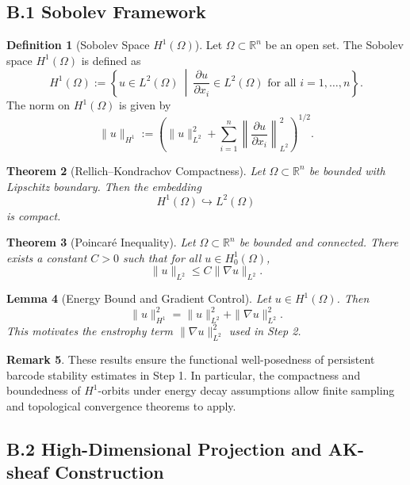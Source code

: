 \documentclass[11pt]{article}
\newtheorem{theorem}{Theorem}[section]
\newtheorem{lemma}[theorem]{Lemma}
\theoremstyle{definition}
\newtheorem{definition}[theorem]{Definition}
\newtheorem{remark}[theorem]{Remark}
\begin{document}
\subsection*{B.1 Sobolev Framework}

\begin{definition}[Sobolev Space \( H^1(\Omega) \)]
Let \( \Omega \subset \mathbb{R}^n \) be an open set. The Sobolev space \( H^1(\Omega) \) is defined as
\[
H^1(\Omega) := \left\{ u \in L^2(\Omega) \ \middle| \ \frac{\partial u}{\partial x_i} \in L^2(\Omega) \text{ for all } i = 1,\dots,n \right\}.
\]
The norm on \( H^1(\Omega) \) is given by
\[
\|u\|_{H^1} := \left( \|u\|_{L^2}^2 + \sum_{i=1}^n \left\| \frac{\partial u}{\partial x_i} \right\|_{L^2}^2 \right)^{1/2}.
\]
\end{definition}

\begin{theorem}[Rellich--Kondrachov Compactness]
Let \( \Omega \subset \mathbb{R}^n \) be bounded with Lipschitz boundary. Then the embedding
\[
H^1(\Omega) \hookrightarrow L^2(\Omega)
\]
is compact.
\end{theorem}

\begin{theorem}[Poincar\'e Inequality]
Let \( \Omega \subset \mathbb{R}^n \) be bounded and connected. There exists a constant \( C > 0 \) such that for all \( u \in H^1_0(\Omega) \),
\[
\|u\|_{L^2} \leq C \|\nabla u\|_{L^2}.
\]
\end{theorem}

\begin{lemma}[Energy Bound and Gradient Control]
Let \( u \in H^1(\Omega) \). Then
\[
\|u\|_{H^1}^2 = \|u\|_{L^2}^2 + \|\nabla u\|_{L^2}^2.
\]
This motivates the enstrophy term \( \|\nabla u\|_{L^2}^2 \) used in Step 2.
\end{lemma}

\begin{remark}
These results ensure the functional well-posedness of persistent barcode stability estimates in Step 1. In particular, the compactness and boundedness of \( H^1 \)-orbits under energy decay assumptions allow finite sampling and topological convergence theorems to apply.
\end{remark}

\subsection*{B.2 High-Dimensional Projection and AK-sheaf Construction}
\end{document}
